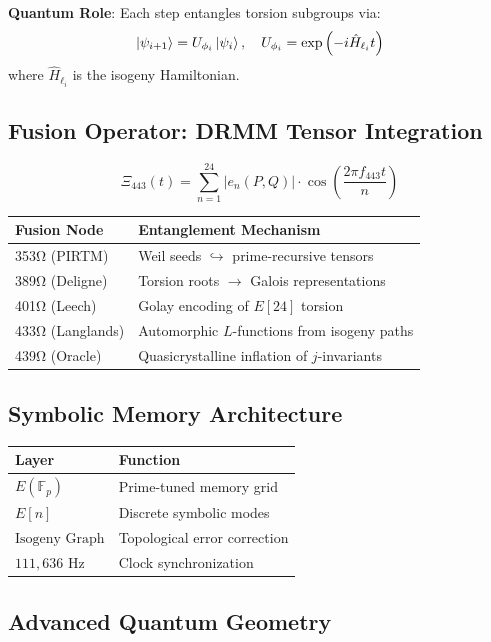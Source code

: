 \documentclass[12pt]{article}
\begin{document}
\noindent \textbf{Quantum Role}: Each step entangles torsion subgroups via:
\[
\ket{\psi_{i+1}} = U_{\phi_i} \ket{\psi_i}, \quad U_{\phi_i} = \exp\left(-i \hat{H}_{\ell_i} t\right)
\]
where $\hat{H}_{\ell_i}$ is the isogeny Hamiltonian.

\subsection*{Fusion Operator: DRMM Tensor Integration}
\[
\Xi_{443}(t) = \sum_{n=1}^{24} |e_n(P, Q)| \cdot \cos\left(\frac{2\pi f_{443} t}{n}\right)
\]
\begin{table}[h]
\centering
\begin{tabular}{ll}
\toprule
\textbf{Fusion Node} & \textbf{Entanglement Mechanism} \\
\midrule
353Ω (PIRTM) & Weil seeds $\hookrightarrow$ prime-recursive tensors \\
389Ω (Deligne) & Torsion roots $\to$ Galois representations \\
401Ω (Leech) & Golay encoding of $E[24]$ torsion \\
433Ω (Langlands) & Automorphic $L$-functions from isogeny paths \\
439Ω (Oracle) & Quasicrystalline inflation of $j$-invariants \\
\bottomrule
\end{tabular}
\end{table}

\subsection*{Symbolic Memory Architecture}
\begin{table}[h]
\centering
\begin{tabular}{ll}
\toprule
\textbf{Layer} & \textbf{Function} \\
\midrule
$E(\mathbb{F}_p)$ & Prime-tuned memory grid \\
$E[n]$ & Discrete symbolic modes \\
$\text{Isogeny Graph}$ & Topological error correction \\
$111,\!636$ Hz & Clock synchronization \\
\bottomrule
\end{tabular}
\end{table}

\subsection*{Advanced Quantum Geometry}
\end{document}
